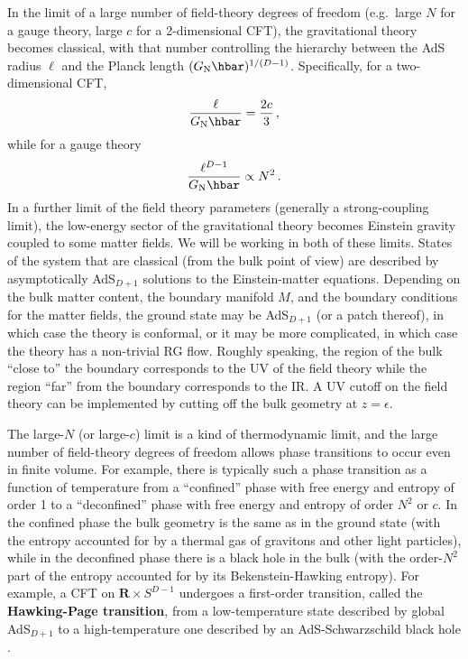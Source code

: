 \documentclass[11pt]{article}
\newcommand{\R}{\mathbf{R}}
\newcommand{\GN}{G_{\rm N}}
\begin{document}
In the limit of a large number of field-theory degrees of freedom (e.g.\ large $N$ for a gauge theory, large $c$ for a 2-dimensional CFT), the gravitational theory becomes classical, with that number controlling the hierarchy between the AdS radius $\ell$ and the Planck length $(\GN\hbar)^{1/(D-1)}$. Specifically, for a two-dimensional CFT,
\begin{equation}\label{ell over GN}
\frac \ell{\GN\hbar} = \frac{2c}3\,,
\end{equation}
while for a gauge theory
\begin{equation}\label{ell over GN2}
\frac{\ell^{D-1}}{\GN\hbar}\propto N^2\,.
\end{equation}
In a further limit of the field theory parameters (generally a strong-coupling limit), the low-energy sector of the gravitational theory becomes Einstein gravity coupled to some matter fields. We will be working in both of these limits. States of the system that are classical (from the bulk point of view) are described by asymptotically AdS${}_{D+1}$ solutions to the Einstein-matter equations. Depending on the bulk matter content, the boundary manifold $M$, and the boundary conditions for the matter fields, the ground state may be AdS${}_{D+1}$ (or a patch thereof), in which case the theory is conformal, or it may be more complicated, in which case the theory has a non-trivial RG flow. Roughly speaking, the region of the bulk ``close to'' the boundary corresponds to the UV of the field theory while the region ``far'' from the boundary corresponds to the IR. A UV cutoff on the field theory can be implemented by cutting off the bulk geometry at $z=\epsilon$.

The large-$N$ (or large-$c$) limit is a kind of thermodynamic limit, and the large number of field-theory degrees of freedom allows phase transitions to occur even in finite volume. For example, there is typically such a phase transition as a function of temperature from a ``confined'' phase with free energy and entropy of order 1 to a ``deconfined'' phase with free energy and entropy of order $N^2$ or $c$. In the confined phase the bulk geometry is the same as in the ground state (with the entropy accounted for by a thermal gas of gravitons and other light particles), while in the deconfined phase there is a black hole in the bulk (with the order-$N^2$ part of the entropy accounted for by its Bekenstein-Hawking entropy). For example, a CFT on $\R\times S^{D-1}$ undergoes a first-order transition, called the \textbf{Hawking-Page transition}, from a low-temperature state described by global AdS${}_{D+1}$ to a high-temperature one described by an AdS-Schwarzschild black hole \cite{Witten:1998zw}.
\end{document}

